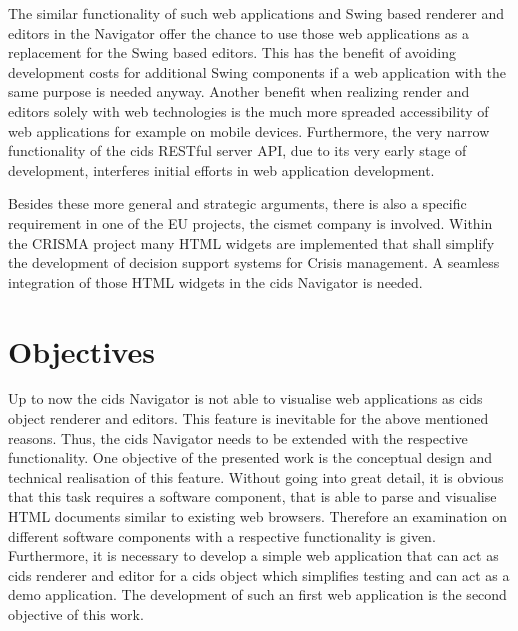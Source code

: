 The similar functionality of such web applications and Swing based renderer and editors in the Navigator offer the chance to use those web applications as a replacement for the Swing based editors.
This has the benefit of avoiding development costs for additional Swing components if a web application with the same purpose is needed anyway.
Another benefit when realizing render and editors solely with web technologies is the much more spreaded accessibility of web applications for example on mobile devices. 
Furthermore, the very narrow functionality of the cids RESTful server API, due to its very early stage of development, interferes initial efforts in web application development.
 
Besides these more general and strategic arguments, there is also a specific requirement in one of the EU projects, the cismet company is involved.
Within the CRISMA project many HTML widgets are implemented that shall simplify the development of decision support systems for Crisis management.
A seamless integration of those HTML widgets in the cids Navigator is needed.

\section{Objectives}\label{chap:intro-objectives}

Up to now the cids Navigator is not able to visualise web applications as cids object renderer and editors.
This feature is inevitable for the above mentioned reasons.
Thus, the cids Navigator needs to be extended with the respective functionality.
One objective of the presented work is the conceptual design and technical realisation of this feature.
Without going into great detail, it is obvious that this task requires a software component, that is able to parse and visualise HTML documents similar to existing web browsers.
Therefore an examination on different software components with a respective functionality is given.
Furthermore, it is necessary to develop a simple web application that can act as cids renderer and editor for a cids object which simplifies testing and can act as a demo application.
The development of such an first web application is the second objective of this work.

